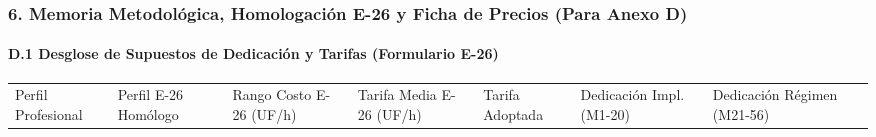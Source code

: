 \subsubsection{6. Memoria Metodológica, Homologación E-26 y Ficha de Precios (Para Anexo D)}\label{memoria-metodoluxf3gica-homologaciuxf3n-e-26-y-ficha-de-precios-para-anexo-d}

\paragraph{D.1 Desglose de Supuestos de Dedicación y Tarifas (Formulario E-26)}\label{d.1-desglose-de-supuestos-de-dedicaciuxf3n-y-tarifas-formulario-e-26}

{\def\LTcaptype{none} %
\begin{longtable}[]{@{}
  >{\raggedright\arraybackslash}p{}
  >{\raggedright\arraybackslash}p{}
  >{\centering\arraybackslash}p{}
  >{\centering\arraybackslash}p{}
  >{\centering\arraybackslash}p{}
  >{\centering\arraybackslash}p{}
  >{\centering\arraybackslash}p{}
  >{\raggedright\arraybackslash}p{}@{}}
\toprule\noalign{}
\begin{minipage}[b]{\linewidth}\raggedright
Perfil Profesional
\end{minipage} & \begin{minipage}[b]{\linewidth}\raggedright
Perfil E-26 Homólogo
\end{minipage} & \begin{minipage}[b]{\linewidth}\centering
Rango Costo E-26 (UF/h)
\end{minipage} & \begin{minipage}[b]{\linewidth}\centering
Tarifa Media E-26 (UF/h)
\end{minipage} & \begin{minipage}[b]{\linewidth}\centering
Tarifa Adoptada
\end{minipage} & \begin{minipage}[b]{\linewidth}\centering
Dedicación Impl. (M1-20)
\end{minipage} & \begin{minipage}[b]{\linewidth}\centering
Dedicación Régimen (M21-56)
\end{minipage} & \begin{minipage}[b]{\linewidth}\raggedright

\end{minipage}
\end{longtable}}
